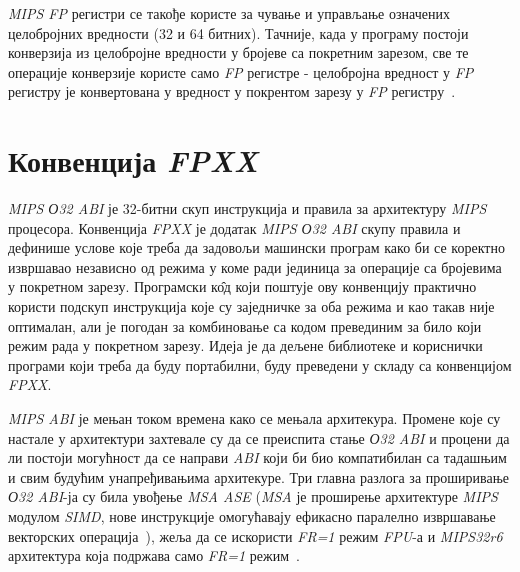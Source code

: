 \documentclass[12pt,oneside]{memoir}
\begin{document}
\indent \textit{MIPS FP} регистри се такође користе за чување и управљање означених целобројних вредности (32 и 64 битних). Тачније, када у програму постоји конверзија из целобројне вредности у бројеве са покретним зарезом, све те операције конверзије користе само \textit{FP} регистре - целобројна вредност у  \textit{FP} регистру је конвертована у вредност у покрентом зарезу у  \textit{FP} регистру~\cite{SeeMIPSRun}.

\section{Конвенција \textit{FPXX}}
\label{sec_fpxx}

\indent \textit{MIPS О32 ABI} је 32-битни скуп инструкција и правила за архитектуру \textit{MIPS} процесора. Конвенција \textit{FPXX} је додатак \textit{MIPS О32 ABI} скупу правила и дефинише услове које треба да задовољи машински програм како би се коректно извршавао независно од режима у коме ради јединица за операције са бројевима у покретном зарезу. Програмски к\^{о}д који поштује ову конвенцију практично користи подскуп инструкција које су заједничке за оба режима и као такав није оптималан, али је погодан за комбиновање са кодом превединим за било који режим рада у покретном зарезу. Идеја је да дељене библиотеке и кориснички програми који треба да буду портабилни, буду преведени у складу са конвенцијом \textit{FPXX}.


\indent \textit{MIPS ABI} је мењан током времена како се мењала архитекура. Промене које су настале у архитектури захтевале су да се преиспита стање \textit{О32 ABI} и процени да ли постоји могућност да се направи \textit{ABI} који би био компатибилан са тадашњим и свим будућим унапређивањима архитекуре. Три главна разлога за проширивање \textit{О32 ABI}-ја су била увођење \textit{MSA ASE} (\textit{MSA} је проширење архитектуре \textit{MIPS} модулом \textit{SIMD}, нове инструкције омогућавају ефикасно паралелно извршавање векторских операција~\cite{MSA}), жеља да се искористи \textit{FR=1} режим \textit{FPU}-а и \textit{MIPS32r6} архитектура која подржава само \textit{FR=1} режим~\cite{fpxxRef}.
\end{document}
